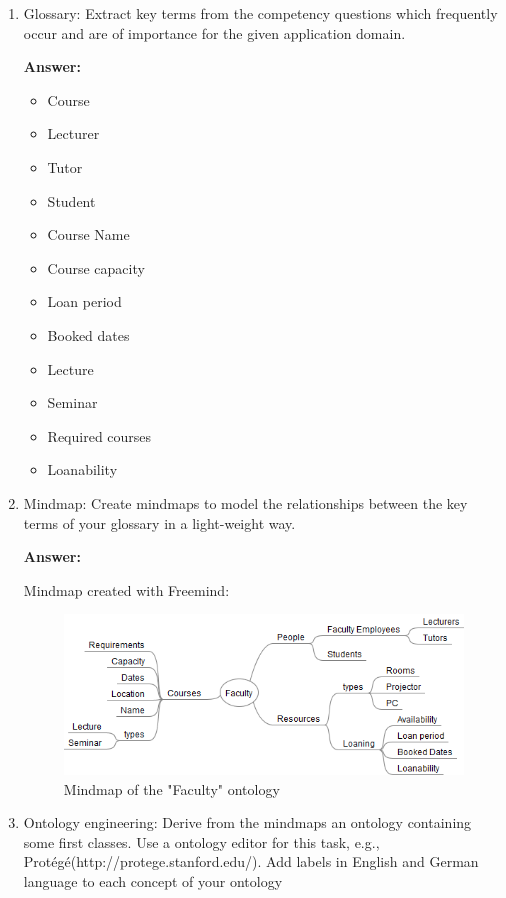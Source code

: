 \documentclass[10pt,a4paper]{article}
\begin{document}
\begin{enumerate}
\begin{enumerate}
\item Glossary: Extract key terms from the competency questions which frequently occur and are of importance for the given application domain. 

\textbf{Answer:}

\begin{itemize}
\item Course
\item Lecturer
\item Tutor
\item Student
\item Course Name
\item Course capacity
\item Loan period
\item Booked dates
\item Lecture 
\item Seminar
\item Required courses
\item Loanability
\end{itemize}

\item Mindmap: Create mindmaps to model the relationships between the key terms of your glossary in a light-weight way.

\textbf{Answer:}

Mindmap created with Freemind:

\begin{figure}[H]
  \caption{Mindmap of the "Faculty" ontology}
  \centering
    \includegraphics[scale=0.7]{Faculty_mindmap.png}
\end{figure}



\item Ontology engineering: Derive from the mindmaps an ontology containing some first classes. Use a ontology editor for this task, e.g., Protégé(http://protege.stanford.edu/). Add labels in English and German language to each concept of your ontology


\end{enumerate}
\end{enumerate}
\end{document}
